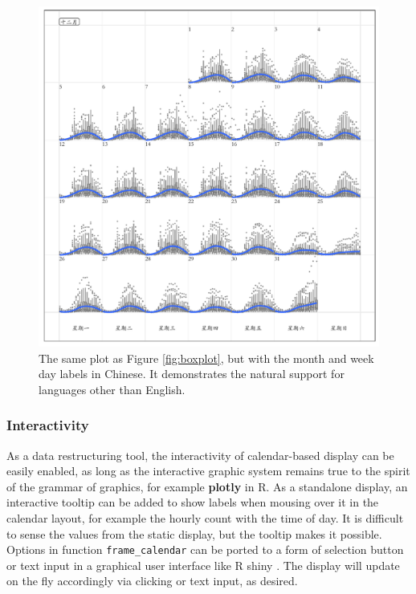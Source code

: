 \documentclass[12pt]{article}
\begin{document}
\begin{figure}

{\centering \includegraphics[width=\textwidth]{img/chn-1-embedded} 

}

\caption{The same plot as Figure \ref{fig:boxplot}, but with the month and week day labels in Chinese. It demonstrates the natural support for languages other than English.}\label{fig:chn-embedded}
\end{figure}

\hypertarget{interactivity}{%
\subsubsection{Interactivity}\label{interactivity}}

As a data restructuring tool, the interactivity of calendar-based
display can be easily enabled, as long as the interactive graphic system
remains true to the spirit of the grammar of graphics, for example
\textbf{plotly} \citep{plotly} in R. As a standalone display, an
interactive tooltip can be added to show labels when mousing over it in
the calendar layout, for example the hourly count with the time of day.
It is difficult to sense the values from the static display, but the
tooltip makes it possible. Options in function \texttt{frame\_calendar}
can be ported to a form of selection button or text input in a graphical
user interface like R shiny \citep{R-shiny}. The display will update on
the fly accordingly via clicking or text input, as desired.
\end{document}
